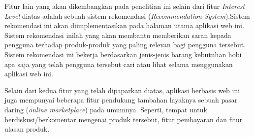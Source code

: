 \documentclass[a4paper]{article}
\begin{document}

Fitur lain yang akan dikembangkan pada penelitian ini selain dari fitur \textit{Interest Level} diatas adalah sebuah sistem rekomendasi (\textit{Recommendation System}).Sistem rekomendasi ini akan diimplementasikan pada halaman utama aplikasi web ini. Sistem rekomendasi inilah yang akan membantu memberikan saran kepada pengguna terhadap produk-produk yang paling relevan bagi pengguna tersebut. Sistem rekomendasi ini bekerja berdasarkan jenis-jenis barang kebutuhan hobi apa saja yang telah pengguna tersebut cari atau lihat selama menggunakan aplikasi web ini.

Selain dari kedua fitur yang telah dipaparkan diatas, aplikasi berbasis web ini juga mempunyai beberapa fitur pendukung tambahan layaknya sebuah pasar daring (\textit{online marketplace}) pada umumnya. Seperti, tempat untuk berdiskusi/berkomentar mengenai produk tersebut, fitur pembayaran dan fitur ulasan produk.
\end{document}
